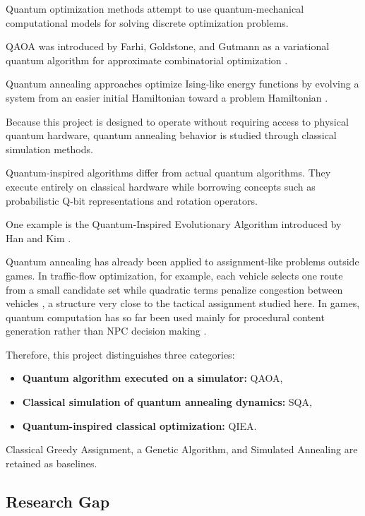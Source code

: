 \documentclass[12pt, a4paper]{article}
\begin{document}
Quantum optimization methods attempt to use quantum-mechanical computational models for solving discrete optimization problems.

QAOA was introduced by Farhi, Goldstone, and Gutmann as a variational quantum algorithm for approximate combinatorial optimization \cite{Farhi2014}.

Quantum annealing approaches optimize Ising-like energy functions by evolving a system from an easier initial Hamiltonian toward a problem Hamiltonian \cite{Kadowaki1998}.

Because this project is designed to operate without requiring access to physical quantum hardware, quantum annealing behavior is studied through classical simulation methods.

Quantum-inspired algorithms differ from actual quantum algorithms. They execute entirely on classical hardware while borrowing concepts such as probabilistic Q-bit representations and rotation operators.

One example is the Quantum-Inspired Evolutionary Algorithm introduced by Han and Kim \cite{HanKim2002}.

Quantum annealing has already been applied to assignment-like problems outside games. In traffic-flow optimization, for example, each vehicle selects one route from a small candidate set while quadratic terms penalize congestion between vehicles \cite{Neukart2017}, a structure very close to the tactical assignment studied here. In games, quantum computation has so far been used mainly for procedural content generation rather than NPC decision making \cite{Wootton2020}.

Therefore, this project distinguishes three categories:

\begin{itemize}
\item \textbf{Quantum algorithm executed on a simulator:} QAOA,
\item \textbf{Classical simulation of quantum annealing dynamics:} SQA,
\item \textbf{Quantum-inspired classical optimization:} QIEA.
\end{itemize}

Classical Greedy Assignment, a Genetic Algorithm, and Simulated Annealing are retained as baselines.

\subsection*{Research Gap}
\end{document}
